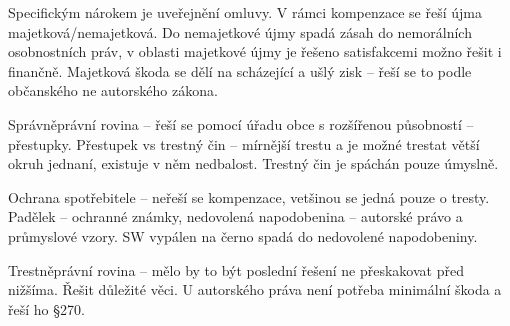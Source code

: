 Specifickým nárokem je uveřejnění omluvy. V rámci kompenzace se řeší újma majetková/nemajetková. Do nemajetkové újmy spadá zásah do nemorálních osobnostních práv, v oblasti majetkové újmy je řešeno satisfakcemi možno řešit i finančně. Majetková škoda se dělí na scházející a ušlý zisk -- řeší se to podle občanského ne autorského zákona.

Správněprávní rovina -- řeší se pomocí úřadu obce s rozšířenou působností -- přestupky. Přestupek vs trestný čin -- mírnější trestu a je možné trestat větší okruh jednaní, existuje v něm nedbalost. Trestný čin je spáchán pouze úmyslně. 

Ochrana spotřebitele -- neřeší se kompenzace, vetšinou se jedná pouze o tresty. Padělek -- ochranné známky, nedovolená napodobenina -- autorské právo a průmyslové vzory. SW vypálen na černo spadá do nedovolené napodobeniny.

Trestněprávní rovina -- mělo by to být poslední řešení ne přeskakovat před nižšíma. Řešit důležité věci. U autorského práva není potřeba minimální škoda a řeší ho §270. 


